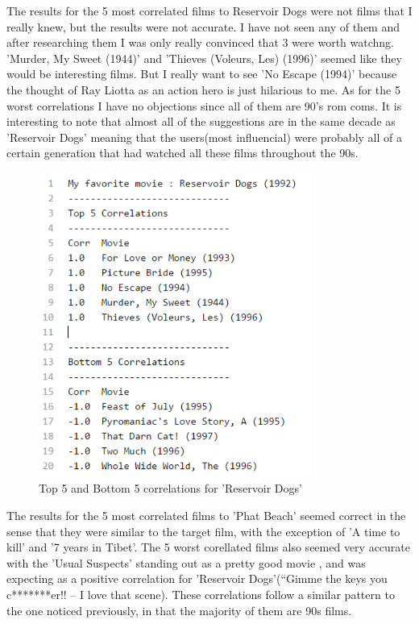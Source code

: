 \documentclass{article}
\begin{document}
\newpage

The results for the 5 most correlated films to Reservoir Dogs were not films that I really knew, but the results were not accurate. I have not seen any of them and after researching them I was only really convinced that 3 were worth watchng. 'Murder, My Sweet (1944)' and 'Thieves (Voleurs, Les) (1996)' seemed like they would be interesting films. But I really want to see 'No Escape (1994)' because the thought of Ray Liotta as an action hero is just hilarious to me. As for the 5 worst correlations I have no objections since all of them are 90's rom coms. It is interesting to note that almost all of the suggestions are in the same decade as 'Reservoir Dogs' meaning that the users(most influencial) were probably all of a certain generation that had watched all these films throughout the 90s.

\begin{figure}[H]
 \centering
 	\includegraphics[height=10cm]{tcorr.png}
  \caption{Top 5 and Bottom 5 correlations for 'Reservoir Dogs'}
\end{figure}

The results for the 5 most correlated films to 'Phat Beach' seemed correct in the sense that they were similar to the target film, with the exception of 'A time to kill' and '7 years in Tibet'. The 5 worst corellated films also seemed very accurate with the 'Usual Suspects' standing out as a pretty good movie , and was expecting as a positive correlation for 'Reservoir Dogs'(``Gimme the keys you c*******er!! -- I love that scene). These correlations follow a similar pattern to the one noticed previously, in that the majority of them are 90s films.
\end{document}
